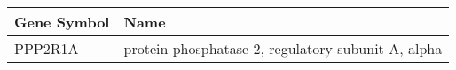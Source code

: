 \begin{tabular}{ll}
\toprule
Gene Symbol &                                               Name \\
\midrule
    PPP2R1A & protein phosphatase 2, regulatory subunit A, alpha \\
\bottomrule
\end{tabular}
